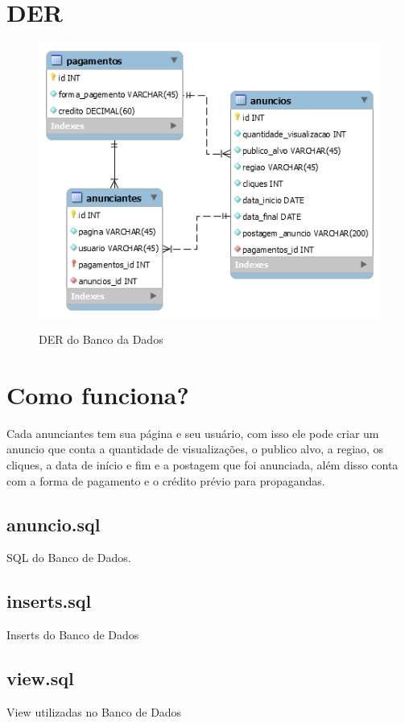 \documentclass[12pt,a4paper]{article}
\begin{document}
\section{DER}

\begin{figure}[h]
\centering
\includegraphics[width=15cm]{recursos/DER.png}
\label{4}
\caption{DER do Banco da Dados}
\end{figure}

\section{Como funciona?}
Cada anunciantes tem sua página e seu usuário, com isso ele pode criar um anuncio que conta a quantidade de visualizações, o publico alvo, a regiao, os cliques, a data de início e fim e a postagem que foi anunciada, além disso conta com a forma de pagamento e o crédito prévio para propagandas.

\subsection{anuncio.sql}
SQL do Banco de Dados.


\subsection{inserts.sql}
Inserts do Banco de Dados


\subsection{view.sql}
View utilizadas no Banco de Dados

\end{document}
